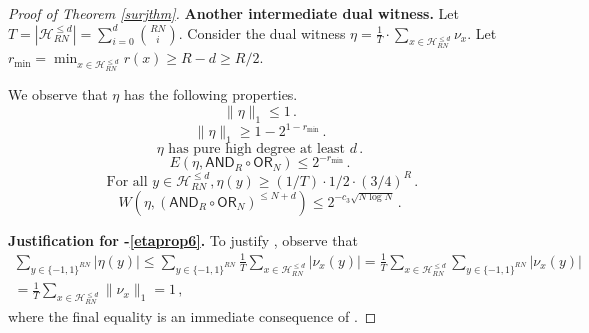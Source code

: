 \documentclass{toc}
\newcommand{\OR}{\mathsf{ OR}}
\newcommand{\bits}{\{-1,1\}}
\newcommand{\Hcal}{\mathcal{H}}
\newcommand{\AND}{\mathsf{AND}}
\begin{document}
\begin{proof}[Proof of Theorem \ref{surjthm}]
	\medskip
	\noindent \textbf{Another intermediate dual witness.}
	Let $T=|\Hcal_{RN}^{\leq d}| = \sum_{i=0}^d {RN \choose i}$. Consider the dual witness $\eta=\frac1T \cdot \sum_{x \in \Hcal^{\leq d}_{RN}} \nu_x$. 
	Let $r_{\text{min}} = \min_{x \in \mathcal{H}_{RN}^{\leq d}} r(x) \geq R-d \geq R/2$. 
	
%
%
%
We observe that $\eta$ has the following properties. %
	\begin{equation}
	\label{etaprop1}
	\|\eta\|_1 \leq 1\,. 
	\end{equation}
	\begin{equation}
	\label{etaprop1prime}
	\|\eta\|_1 \ge  1-2^{1-r_{\text{min}}} \,.
	\end{equation} 
	\begin{equation}
	\label{etaprop2}
	\eta \text{ has pure high degree at least } d\,.
	\end{equation}
	\begin{equation} \label{etaprop3} E(\eta, \AND_R \circ \OR_N) \leq 2^{-r_{\text{min}}}\,.
	\end{equation}
	\begin{equation}
	\text{ For all } y \in \mathcal{H}^{\leq d}_{RN}, \eta(y) \geq (1/T) \cdot 1/2 \cdot (3/4)^{R}\,.
	\label{etaprop5}
	\end{equation} %
	\begin{equation} %
	W(\eta, (\AND_R \circ \OR_N)^{\leq N + d}) \leq 2^{-c_3 \sqrt{N \log N}}\,.
	\label{etaprop6}
	\end{equation}
	
	\medskip \noindent \textbf{Justification for -\eqref{etaprop6}.}
	To justify , observe that
	\begin{align*} \sum_{y \in \bits^{RN}} |\eta(y)| \leq \sum_{y \in \bits^{RN}}\frac1T \sum_{x \in \Hcal^{\leq d}_{RN}} |\nu_x(y)|
	=\frac1T \sum_{x \in \Hcal^{\leq d}_{RN}}  \sum_{y \in \bits^{RN}} |\nu_x(y)|\\ =
	\frac1T \sum_{x \in \Hcal^{\leq d}_{RN}} \|\nu_x\|_1= 1\,,
	\end{align*}
	where the final equality is an immediate  consequence of .
	

\end{proof}
\end{document}

